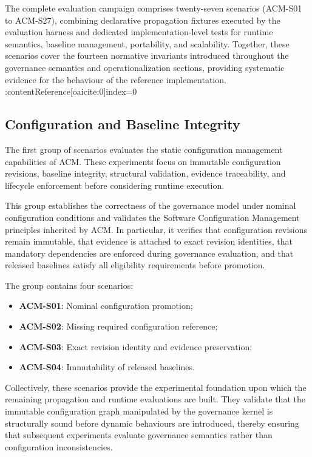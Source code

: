 \documentclass[10pt]{article}
\begin{document}
The complete evaluation campaign comprises twenty-seven scenarios (ACM-S01 to
ACM-S27), combining declarative propagation fixtures executed by the evaluation
harness and dedicated implementation-level tests for runtime semantics,
baseline management, portability, and scalability. Together, these scenarios
cover the fourteen normative invariants introduced throughout the governance
semantics and operationalization sections, providing systematic evidence for
the behaviour of the reference implementation. :contentReference[oaicite:0]{index=0}

\subsection{Configuration and Baseline Integrity}
\label{appendix:configuration_baseline}

The first group of scenarios evaluates the static configuration management
capabilities of ACM. These experiments focus on immutable configuration
revisions, baseline integrity, structural validation, evidence traceability,
and lifecycle enforcement before considering runtime execution.

This group establishes the correctness of the governance model under nominal
configuration conditions and validates the Software Configuration Management
principles inherited by ACM. In particular, it verifies that configuration
revisions remain immutable, that evidence is attached to exact revision
identities, that mandatory dependencies are enforced during governance
evaluation, and that released baselines satisfy all eligibility requirements
before promotion.

The group contains four scenarios:

\begin{itemize}
    \item \textbf{ACM-S01}: Nominal configuration promotion;
    \item \textbf{ACM-S02}: Missing required configuration reference;
    \item \textbf{ACM-S03}: Exact revision identity and evidence preservation;
    \item \textbf{ACM-S04}: Immutability of released baselines.
\end{itemize}

Collectively, these scenarios provide the experimental foundation upon which
the remaining propagation and runtime evaluations are built. They validate that
the immutable configuration graph manipulated by the governance kernel is
structurally sound before dynamic behaviours are introduced, thereby ensuring
that subsequent experiments evaluate governance semantics rather than
configuration inconsistencies.
\label{app:scenario_group_a}
\end{document}
